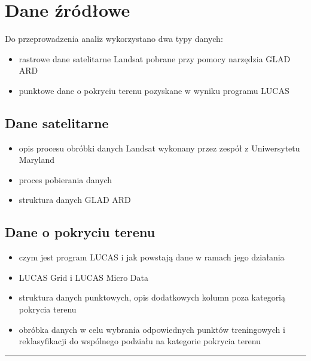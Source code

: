 \documentclass{amuthesis}
\begin{document}

\hypertarget{sec-dane}{%
\chapter{Dane źródłowe}\label{sec-dane}}

Do przeprowadzenia analiz wykorzystano dwa typy danych:

\begin{itemize}
\item
  rastrowe dane satelitarne Landsat pobrane przy pomocy narzędzia GLAD
  ARD
\item
  punktowe dane o pokryciu terenu pozyskane w wyniku programu LUCAS
\end{itemize}

\hypertarget{sec-sat}{%
\section{Dane satelitarne}\label{sec-sat}}

\begin{itemize}
\item
  opis procesu obróbki danych Landsat wykonany przez zespół z
  Uniwersytetu Maryland
\item
  proces pobierania danych
\item
  struktura danych GLAD ARD
\end{itemize}

\hypertarget{sec-landcover}{%
\section{Dane o pokryciu terenu}\label{sec-landcover}}

\begin{itemize}
\item
  czym jest program LUCAS i jak powstają dane w ramach jego działania
\item
  LUCAS Grid i LUCAS Micro Data
\item
  struktura danych punktowych, opis dodatkowych kolumn poza kategorią
  pokrycia terenu
\item
  obróbka danych w celu wybrania odpowiednych punktów treningowych i
  reklasyfikacji do wspólnego podziału na kategorie pokrycia terenu
\end{itemize}

\begin{center}\rule{0.5\linewidth}{0.5pt}\end{center}
\end{document}
